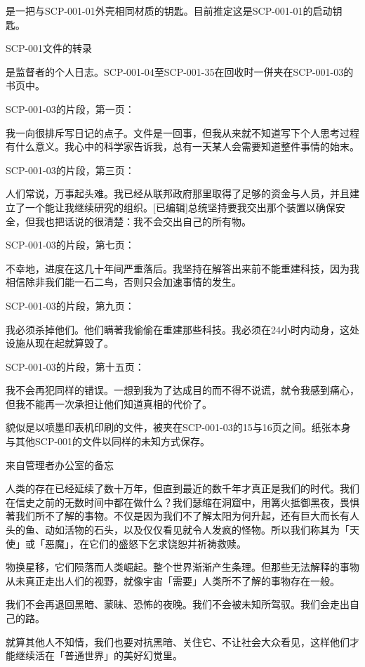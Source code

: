 是一把与SCP-001-01外壳相同材质的钥匙。目前推定这是SCP-001-01的启动钥匙。

SCP-001文件的转录

是监督者的个人日志。SCP-001-04至SCP-001-35在回收时一併夹在SCP-001-03的书页中。

SCP-001-03的片段，第一页：

\begin{scpbox}
我一向很排斥写日记的点子。文件是一回事，但我从来就不知道写下个人思考过程有什么意义。我心中的科学家告诉我，总有一天某人会需要知道整件事情的始末。
\end{scpbox}

SCP-001-03的片段，第三页：

\begin{scpbox}
人们常说，万事起头难。我已经从联邦政府那里取得了足够的资金与人员，并且建立了一个能让我继续研究的组织。[已编辑]总统坚持要我交出那个装置以确保安全，但我也把话说的很清楚：我不会交出自己的所有物。
\end{scpbox}

SCP-001-03的片段，第七页：

\begin{scpbox}
不幸地，进度在这几十年间严重落后。我坚持在解答出来前不能重建科技，因为我相信除非我们能一石二鸟，否则只会加速事情的发生。
\end{scpbox}

SCP-001-03的片段，第九页：

\begin{scpbox}
我必须杀掉他们。他们瞒著我偷偷在重建那些科技。我必须在24小时内动身，这处设施从现在起就算毁了。
\end{scpbox}

SCP-001-03的片段，第十五页：

\begin{scpbox}
我不会再犯同样的错误。一想到我为了达成目的而不得不说谎，就令我感到痛心，但我不能再一次承担让他们知道真相的代价了。
\end{scpbox}

貌似是以喷墨印表机印刷的文件，被夹在SCP-001-03的15与16页之间。纸张本身与其他SCP-001的文件以同样的未知方式保存。

\begin{scpbox}

来自管理者办公室的备忘

人类的存在已经延续了数十万年，但直到最近的数千年才真正是我们的时代。我们在信史之前的无数时间中都在做什么？我们瑟缩在洞窟中，用篝火抵御黑夜，畏惧著我们所不了解的事物。不仅是因为我们不了解太阳为何升起，还有巨大而长有人头的鱼、动如活物的石头，以及仅仅看见就令人发疯的怪物。所以我们称其为「天使」或「恶魔」，在它们的盛怒下乞求饶恕并祈祷救赎。

物换星移，它们陨落而人类崛起。整个世界渐渐产生条理。但那些无法解释的事物从未真正走出人们的视野，就像宇宙「需要」人类所不了解的事物存在一般。

我们不会再退回黑暗、蒙昧、恐怖的夜晚。我们不会被未知所驾驭。我们会走出自己的路。

就算其他人不知情，我们也要对抗黑暗、关住它、不让社会大众看见，这样他们才能继续活在「普通世界」的美好幻觉里。

\end{scpbox}

